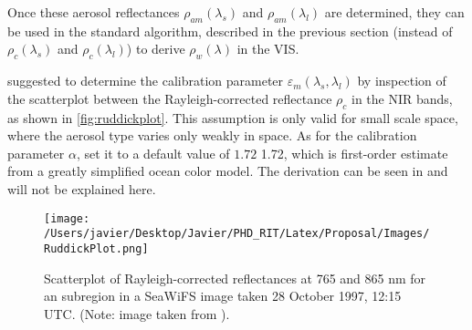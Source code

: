 Once these aerosol reflectances $\rho_{am}(\lambda_s)$ and $\rho_{am}(\lambda_l)$ are determined, they can be used in the standard algorithm, described in the previous section (instead of $\rho_c(\lambda_s)$ and $\rho_c(\lambda_l)$) to derive $\rho_w(\lambda)$ in the VIS.

\cite{Ruddick:2000bs} suggested to determine the calibration parameter $\varepsilon_m(\lambda_s,\lambda_l)$ by inspection of the scatterplot between the Rayleigh-corrected reflectance $\rho_c$ in the NIR bands, as shown in \autoref{fig:ruddickplot}. This assumption is only valid for small scale space, where the aerosol type varies only weakly in space. As for the calibration parameter $\alpha$, \cite{Ruddick:2000bs} set it to a default value of $1.72$ 1.72, which is first-order estimate from a greatly simplified ocean color model. The derivation can be seen in \cite{Ruddick:2000bs} and will not be explained here.

\begin{figure}[!ht]
  \centering
  \texttt{[image: /Users/javier/Desktop/Javier/PHD\_RIT/Latex/Proposal/Images/RuddickPlot.png]}
  \caption{Scatterplot of Rayleigh-corrected reflectances at 765 and 865 nm for an subregion in a SeaWiFS image taken 28 October 1997, 12:15 UTC.  (Note: image taken from \cite{Ruddick:2000bs}). \label{fig:ruddickplot} } 
\end{figure}

